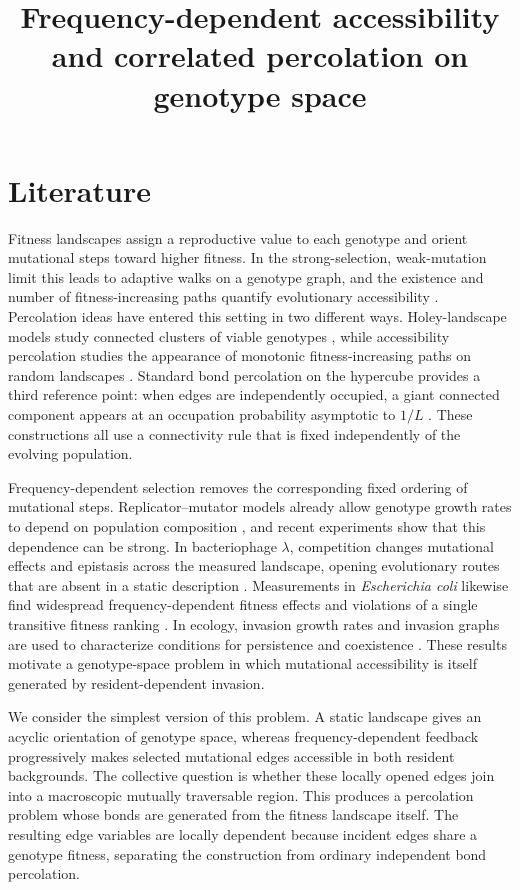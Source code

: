 \documentclass[11pt,reqno]{amsart}
\begin{document}
\title{Frequency-dependent accessibility and correlated percolation on genotype space}
\maketitle

\section{Literature}

Fitness landscapes assign a reproductive value to each genotype and orient mutational steps toward higher fitness. In the strong-selection, weak-mutation limit this leads to adaptive walks on a genotype graph, and the existence and number of fitness-increasing paths quantify evolutionary accessibility \cite{weinreich2006,devisser2014,franke2012,zagorski2016}. Percolation ideas have entered this setting in two different ways. Holey-landscape models study connected clusters of viable genotypes \cite{gavrilets1997}, while accessibility percolation studies the appearance of monotonic fitness-increasing paths on random landscapes \cite{schmiegelt2023}. Standard bond percolation on the hypercube provides a third reference point: when edges are independently occupied, a giant connected component appears at an occupation probability asymptotic to $1/L$ \cite{vanderhofstad2017}. These constructions all use a connectivity rule that is fixed independently of the evolving population.

Frequency-dependent selection removes the corresponding fixed ordering of mutational steps. Replicator--mutator models already allow genotype growth rates to depend on population composition \cite{page2002}, and recent experiments show that this dependence can be strong. In bacteriophage $\lambda$, competition changes mutational effects and epistasis across the measured landscape, opening evolutionary routes that are absent in a static description \cite{doud2024}. Measurements in \emph{Escherichia coli} likewise find widespread frequency-dependent fitness effects and violations of a single transitive fitness ranking \cite{ascensao2025}. In ecology, invasion growth rates and invasion graphs are used to characterize conditions for persistence and coexistence \cite{hofbauer2022}. These results motivate a genotype-space problem in which mutational accessibility is itself generated by resident-dependent invasion.

We consider the simplest version of this problem. A static landscape gives an acyclic orientation of genotype space, whereas frequency-dependent feedback progressively makes selected mutational edges accessible in both resident backgrounds. The collective question is whether these locally opened edges join into a macroscopic mutually traversable region. This produces a percolation problem whose bonds are generated from the fitness landscape itself. The resulting edge variables are locally dependent because incident edges share a genotype fitness, separating the construction from ordinary independent bond percolation.
\end{document}
